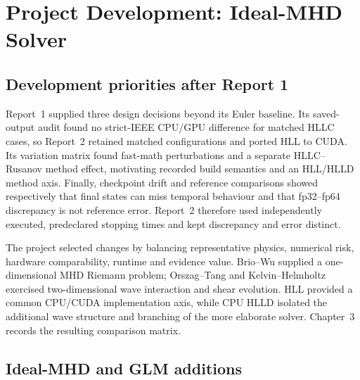 
\chapter{Project Development: Ideal-MHD Solver}

\section{Development priorities after Report 1}
\label{sec:ch2-priorities}

Report~1 supplied three design decisions beyond its Euler baseline. Its
saved-output audit found no strict-IEEE CPU/GPU difference for matched HLLC
cases, so Report~2 retained matched configurations and ported HLL to CUDA. Its
variation matrix found fast-math perturbations and a separate HLLC--Rusanov
method effect, motivating recorded build semantics and an HLL/HLLD method
axis. Finally, checkpoint drift and reference comparisons showed respectively
that final states can miss temporal behaviour and that fp32--fp64 discrepancy
is not reference error. Report~2 therefore used independently executed,
predeclared stopping times and kept discrepancy and error distinct.

The project selected changes by balancing representative physics, numerical
risk, hardware comparability, runtime and evidence value. Brio--Wu supplied a
one-dimensional MHD Riemann problem; Orszag--Tang and Kelvin--Helmholtz
exercised two-dimensional wave interaction and shear evolution. HLL provided a
common CPU/CUDA implementation axis, while CPU HLLD isolated the additional
wave structure and branching of the more elaborate solver. Chapter~3 records
the resulting comparison matrix.

\section{Ideal-MHD and GLM additions}
\label{sec:ch2-mhd-glm}

